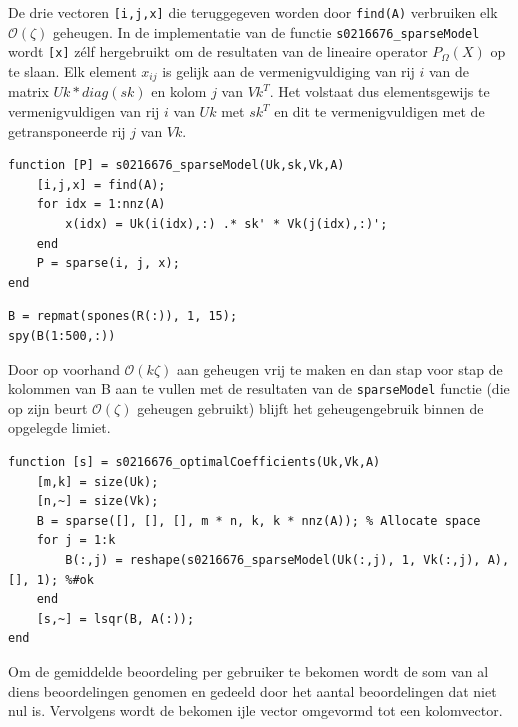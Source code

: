 

De drie vectoren \texttt{[i,j,x]} die teruggegeven worden door \texttt{find(A)} verbruiken elk $\mathcal{O}(\zeta)$ geheugen. In de implementatie van de functie \texttt{s0216676\_sparseModel} wordt \texttt{[x]} z\'elf hergebruikt om de resultaten van de lineaire operator $P_{\Omega}(X)$ op te slaan. Elk element $x_{ij}$ is gelijk aan de vermenigvuldiging van rij $i$ van de matrix $Uk*diag(sk)$ en kolom $j$ van $Vk^T$. Het volstaat dus elementsgewijs te vermenigvuldigen van rij $i$ van $Uk$ met $sk^T$ en dit te vermenigvuldigen met de getransponeerde rij $j$ van $Vk$.

\begin{lstlisting}
function [P] = s0216676_sparseModel(Uk,sk,Vk,A)
    [i,j,x] = find(A);
    for idx = 1:nnz(A)
        x(idx) = Uk(i(idx),:) .* sk' * Vk(j(idx),:)';
    end
    P = sparse(i, j, x);
end
\end{lstlisting}



\begin{lstlisting}
B = repmat(spones(R(:)), 1, 15);
spy(B(1:500,:))
\end{lstlisting}



Door op voorhand $\mathcal{O}(k\zeta)$ aan geheugen vrij te maken en dan stap voor stap de kolommen van B aan te vullen met de resultaten van de \texttt{sparseModel} functie (die op zijn beurt $\mathcal{O}(\zeta)$ geheugen gebruikt) blijft het geheugengebruik binnen de opgelegde limiet.

\begin{lstlisting}
function [s] = s0216676_optimalCoefficients(Uk,Vk,A)
    [m,k] = size(Uk);
    [n,~] = size(Vk);
    B = sparse([], [], [], m * n, k, k * nnz(A)); % Allocate space
    for j = 1:k
        B(:,j) = reshape(s0216676_sparseModel(Uk(:,j), 1, Vk(:,j), A), [], 1); %#ok
    end
    [s,~] = lsqr(B, A(:));
end
\end{lstlisting}



Om de gemiddelde beoordeling per gebruiker te bekomen wordt de som van al diens beoordelingen genomen en gedeeld door het aantal beoordelingen dat niet nul is. Vervolgens wordt de bekomen ijle vector omgevormd tot een kolomvector.

